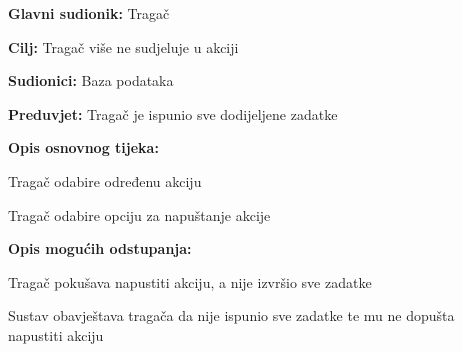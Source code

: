 				\noindent {}
				\begin{packed_item}
					
					\item \textbf{Glavni sudionik: }Tragač
					\item  \textbf{Cilj:} Tragač više ne sudjeluje u akciji
					\item  \textbf{Sudionici:} Baza podataka
					\item  \textbf{Preduvjet:} Tragač je ispunio sve dodijeljene zadatke
					\item  \textbf{Opis osnovnog tijeka:}
					
					\item[] \begin{packed_enum}
						
						\item Tragač odabire određenu akciju
						\item Tragač odabire opciju za napuštanje akcije

					\end{packed_enum}
					
					\item  \textbf{Opis mogućih odstupanja:}
					
					\item[] \begin{packed_item}
						
						\item[1.a] Tragač pokušava napustiti akciju, a nije izvršio sve zadatke
						\item[] \begin{packed_enum}
							
							\item Sustav obavještava tragača da nije ispunio sve zadatke te mu ne dopušta napustiti akciju
							
						\end{packed_enum}
						
					\end{packed_item}
					
				\end{packed_item}
				

